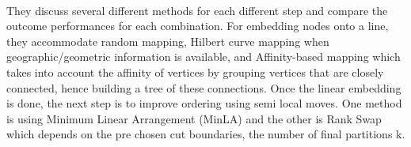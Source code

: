 \paragraph{} 

They discuss several different methods for each different step and compare the outcome performances for each combination. For embedding nodes onto a line, they accommodate random mapping, Hilbert curve mapping when geographic/geometric information is available, and Affinity-based mapping which takes into account the affinity of vertices by grouping vertices that are closely connected, hence building a tree of these connections. Once the linear embedding is done, the next step is to improve ordering using semi local moves. One method is using Minimum Linear Arrangement (MinLA)\cite{MinLA} and the other is Rank Swap which depends on the pre chosen cut boundaries, the number of final partitions k.

